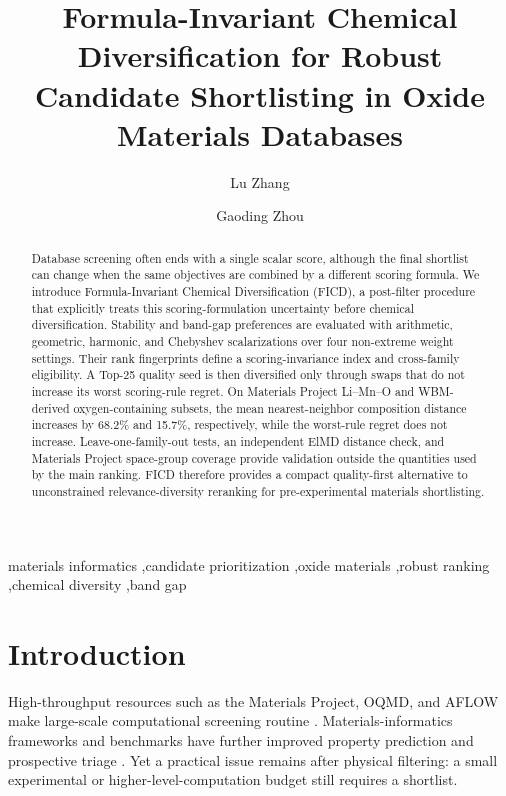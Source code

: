 \documentclass[final,5p,times,twocolumn]{elsarticle}
\begin{document}
\begin{frontmatter}

\title{Formula-Invariant Chemical Diversification for Robust Candidate Shortlisting in Oxide Materials Databases}
\author[aff1]{Lu Zhang}
\author[aff2]{Gaoding Zhou}
\address[aff1]{School of Materials Science and Engineering, Changchun University of Science and Technology, Changchun 130022, China}
\address[aff2]{School of Artificial Intelligence, Changchun University of Science and Technology, Changchun 130022, China}

\begin{abstract}
Database screening often ends with a single scalar score, although the final shortlist can change when the same objectives are combined by a different scoring formula. We introduce Formula-Invariant Chemical Diversification (FICD), a post-filter procedure that explicitly treats this scoring-formulation uncertainty before chemical diversification. Stability and band-gap preferences are evaluated with arithmetic, geometric, harmonic, and Chebyshev scalarizations over four non-extreme weight settings. Their rank fingerprints define a scoring-invariance index and cross-family eligibility. A Top-25 quality seed is then diversified only through swaps that do not increase its worst scoring-rule regret. On Materials Project Li--Mn--O and WBM-derived oxygen-containing subsets, the mean nearest-neighbor composition distance increases by 68.2\% and 15.7\%, respectively, while the worst-rule regret does not increase. Leave-one-family-out tests, an independent ElMD distance check, and Materials Project space-group coverage provide validation outside the quantities used by the main ranking. FICD therefore provides a compact quality-first alternative to unconstrained relevance-diversity reranking for pre-experimental materials shortlisting.
\end{abstract}

\begin{keyword}
materials informatics \sep candidate prioritization \sep oxide materials \sep robust ranking \sep chemical diversity \sep band gap
\end{keyword}
\end{frontmatter}

\section{Introduction}
High-throughput resources such as the Materials Project, OQMD, and AFLOW make large-scale computational screening routine \cite{Jain2013,Saal2013,Curtarolo2012}. Materials-informatics frameworks and benchmarks have further improved property prediction and prospective triage \cite{Ward2016,Butler2018,Morgan2020,Dunn2020,Riebesell2025}. Yet a practical issue remains after physical filtering: a small experimental or higher-level-computation budget still requires a shortlist.
\end{document}
